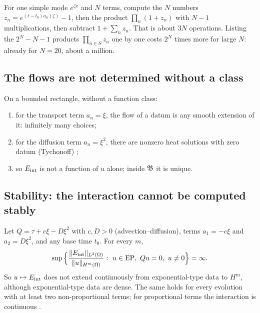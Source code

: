 \begin{example}
For one simple mode $e^{\zeta x}$ and $N$ terms, compute the $N$ numbers $z_n=e^{(t-t_0)a_n(\zeta)}-1$, then the product $\prod_n(1+z_n)$ with $N-1$ multiplications, then subtract $1+\sum_nz_n$. That is about $3N$ operations. Listing the $2^N-N-1$ products $\prod_{n\in S}z_n$ one by one costs $2^N$ times more for large $N$: already for $N=20$, about a million.
\end{example}

\subsection{The flows are not determined without a class}

\begin{proposition}\label{prop:nonuniq}
On a bounded rectangle, without a function class:
\begin{enumerate}[label=(\alph*)]
\item for the transport term $a_n=\xi$, the flow of a datum is any smooth extension of it: infinitely many choices;
\item for the diffusion term $a_n=\xi^2$, there are nonzero heat solutions with zero datum (Tychonoff) \cf;
\item so $E_{\mathrm{int}}$ is not a function of $u$ alone; inside $\mathfrak{B}$ it is unique.
\end{enumerate}
\end{proposition}

\subsection{Stability: the interaction cannot be computed stably}

\begin{theorem}\label{f:thm:nocont}
Let $Q=\tau+c\xi-D\xi^2$ with $c,D>0$ (advection--diffusion), terms $a_1=-c\xi$ and $a_2=D\xi^2$, and any base time $t_0$. For every $m$,
\[
\sup\Big\{\frac{\|\Eint\|_{L^2(\Omega)}}{\|u\|_{H^m(\Omega)}}:\ u\in\EP,\ Qu=0,\ u\ne0\Big\}=\infty .
\]
So $u\mapsto E_{\mathrm{int}}$ does not extend continuously from exponential-type data to $H^m$, although exponential-type data are dense. The same holds for every evolution with at least two non-proportional terms; for proportional terms the interaction is continuous  \proved.

\end{theorem}

